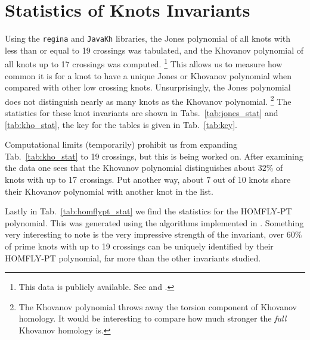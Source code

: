 \section{Statistics of Knots Invariants}
    Using the \texttt{regina} and \texttt{JavaKh} libraries, the Jones
    polynomial of all knots with less than or equal to 19 crossings was
    tabulated, and the Khovanov polynomial of all knots up to 17 crossings
    was computed.%
    \footnote{%
        This data is publicly available. See
        \cite{JonesData} and \cite{KhovanovData}.
    }
    This allows us to measure how common it is for a knot
    to have a unique Jones or Khovanov polynomial when compared with other
    low crossing knots. Unsurprisingly, the Jones polynomial does not
    distinguish nearly as many knots as the Khovanov polynomial.%
    \footnote{%
        The Khovanov polynomial throws away the torsion component of
        Khovanov homology. It would be interesting to compare how much
        stronger the \textit{full} Khovanov homology is.
    }
    The statistics for these knot invariants are shown in
    Tabs.~\ref{tab:jones_stat} and \ref{tab:kho_stat}, the key for the
    tables is given in Tab.~\ref{tab:key}.
    \par\hfill\par
    Computational limits (temporarily) prohibit us from expanding
    Tab.~\ref{tab:kho_stat} to 19 crossings, but this is being worked on.
    After examining the data one sees that the Khovanov polynomial
    distinguishes about $32\%$ of knots with up to 17 crossings. Put
    another way, about 7 out of 10 knots share their Khovanov polynomial
    with another knot in the list.
    \par\hfill\par
    Lastly in Tab.~\ref{tab:homflypt_stat} we find the statistics for the
    HOMFLY-PT polynomial. This was generated using the algorithms implemented
    in \cite{regina}. Something very interesting to note is the very impressive
    strength of the invariant, over $60\%$ of prime knots with up to 19
    crossings can be uniquely identified by their HOMFLY-PT polynomial, far
    more than the other invariants studied.
